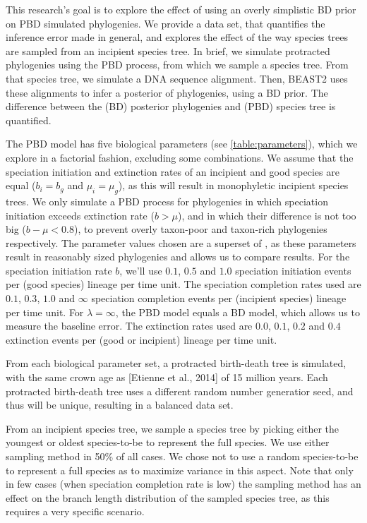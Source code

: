\documentclass{article}
\begin{document}
This research's goal is to explore the effect of using an overly simplistic
BD prior on PBD simulated phylogenies. We provide a data set, 
that quantifies the inference error made in general, and explores
the effect of the way species trees are sampled from an incipient species tree.  
In brief, we simulate protracted phylogenies using the PBD process,
from which we sample a species tree. From that species tree, 
we simulate a DNA sequence alignment. Then, BEAST2 uses these alignments
to infer a posterior of phylogenies, using a BD prior. The difference
between the (BD) posterior phylogenies and (PBD) species tree is quantified.


The PBD model has five biological parameters (see \ref{table:parameters}), 
which we explore in a factorial fashion, excluding some combinations. 
We assume that the speciation initiation and extinction rates
of an incipient and good species are equal ($b_i = b_g$ and $\mu_i = \mu_g$),
as this will result in monophyletic incipient species trees.
We only simulate a PBD process for phylogenies in which
speciation initiation exceeds extinction rate ($b > \mu$),
and in which their difference is not too big ($b - \mu < 0.8$), 
to prevent overly taxon-poor and taxon-rich phylogenies respectively.
The parameter values chosen are a 
superset of \cite{etienne2014}, as these parameters result in reasonably
sized phylogenies and allows us to compare results. 
For the speciation initiation rate $b$, we'll use $0.1$, $0.5$ and $1.0$ 
speciation initiation events per (good species) lineage per time unit.
The speciation completion rates used are $0.1$, $0.3$, $1.0$ and $\infty$ speciation completion
events per (incipient species) lineage per time unit. For $\lambda = \infty$, 
the PBD model equals a BD model, which allows us to measure the baseline error.
The extinction rates used are $0.0$, $0.1$, $0.2$ and $0.4$ 
extinction events per (good or incipient) lineage per time unit.

From each biological parameter set, a protracted birth-death tree is simulated,
with the same crown age as [Etienne et al., 2014] of 15 million years. 
Each protracted birth-death tree uses a different random number
generatior seed, and thus will be unique, resulting in a balanced 
data set. 

From an incipient species tree, we sample a species tree
by picking either the youngest or oldest
species-to-be to represent the full species.
We use either sampling method in 50\% of all cases. We chose not to use
a random species-to-be to represent a full species as to maximize variance
in this aspect. Note that only in few cases (when speciation completion rate
is low) the sampling method has an effect on the branch length distribution
of the sampled species tree, as this requires a very specific scenario.
\end{document}
